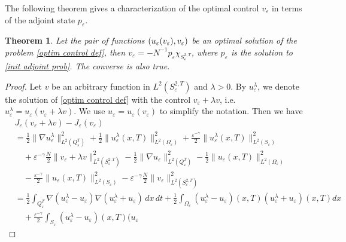 \documentclass[10pt,a4paper]{amsart}
\numberwithin{equation}{section}
\newtheorem{theorem}{Theorem}[section]
\begin{document}
The following theorem gives a characterization of the optimal control 
$v_{\varepsilon }$ in terms of the adjoint state $p_{\varepsilon }$.

\begin{theorem}
\label{thm: init opt cont} 
Let the pair of functions $(u_\varepsilon(v_%
\varepsilon), v_\varepsilon)$ be an optimal solution of the problem 
\eqref{optim control def}, then $v_\varepsilon = -N^{-1}p_\varepsilon
\chi_{S^{2, T}_\varepsilon}$, 
where $p_\varepsilon$ is the solution to 
\eqref{init adjoint prob}. The converse is also true.
\end{theorem}

\begin{proof}
Let $v$ be an arbitrary function in $L^2(S^{2 ,T} _{\varepsilon })$ and 
$\lambda >0$. By $u_{\varepsilon }^{\lambda }$, we denote the solution of 
\eqref{optim control def} with the control $v_{\varepsilon }+\lambda v$,
i.e.\ $u_{\varepsilon }^{\lambda }=u_{\varepsilon }(v_{\varepsilon }+\lambda v)$. 
We use $u_{\varepsilon }=u_{\varepsilon }(v_{\varepsilon })$ to
simplify the notation. Then we have
\begin{align*}
&J_{\varepsilon }(v_{\varepsilon }+\lambda v)-J_{\varepsilon }(v_{\varepsilon })\\
&=\frac{1}{2}\| \nabla u_{\varepsilon }^{\lambda }\|
 _{L^2(Q_{\varepsilon }^{T})}^2+\frac{1}{2}\| u_{\varepsilon
 }^{\lambda }(x,T)\| _{L^2(\Omega _{\varepsilon })}^2 
 +\frac{\varepsilon ^{-\gamma }}{2}\| u_{\varepsilon }^{\lambda
 }(x,T)\| _{L^2(S_{\varepsilon })}^2 \\
&\quad +\varepsilon ^{-\gamma }\frac{N}{2}%
 \| v_{\varepsilon }+\lambda v\| _{L^2(S_{\varepsilon }^{2,T})}^2 
 -\frac{1}{2}\| \nabla u_{\varepsilon }\| _{L^2(Q_{\varepsilon }^{T})}^2
 -\frac{1}{2}\| u_{\varepsilon }(x,T)\| _{L^2(\Omega _{\varepsilon })}^2 \\
&\quad -\frac{\varepsilon ^{-\gamma }}{2}\| u_{\varepsilon }(x,T)\|
 _{L^2(S_{\varepsilon })}^2-\varepsilon ^{-\gamma }\frac{N}{2}\|
 v_{\varepsilon }\| _{L^2(S_{\varepsilon }^{2,T})}^2 \\
& =\frac{1}{2}\int _{Q_{\varepsilon }^{T}}\nabla (u_{\varepsilon
 }^{\lambda }-u_{\varepsilon })\nabla (u_{\varepsilon }^{\lambda
 }+u_{\varepsilon })\,dx\,dt+\frac{1}{2}\int _{\Omega _{\varepsilon
 }}(u_{\varepsilon }^{\lambda }-u_{\varepsilon })(x,T)(u_{\varepsilon
 }^{\lambda }+u_{\varepsilon })(x,T){dx} \\
&\quad +\frac{\varepsilon ^{-\gamma }}{2}\int _{S_{\varepsilon
 }}(u_{\varepsilon }^{\lambda }-u_{\varepsilon })(x,T)(u_{\varepsilon
}
\end{align*}
\end{proof}
\end{document}
